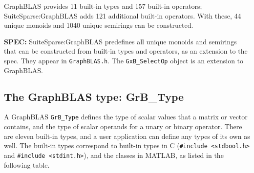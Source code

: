 \documentclass[12pt]{article}
\begin{document}
GraphBLAS provides 11 built-in types and 157 built-in operators;
SuiteSparse:GraphBLAS adds 121 additional built-in operators.  With these,
44 unique monoids and 1040 unique semirings can be constructed.

\begin{spec}
{\bf SPEC:} SuiteSparse:GraphBLAS predefines all unique monoids and semirings
that can be constructed from built-in types and operators, as an extension to
the spec.  They appear in \verb'GraphBLAS.h'.  The \verb'GxB_SelectOp' object
is an extension to GraphBLAS.
\end{spec}

\newpage
\subsection{The GraphBLAS type: {\sf GrB\_Type}} %
\label{type}

A GraphBLAS \verb'GrB_Type' defines the type of scalar values that a matrix or
vector contains, and the type of scalar operands for a unary or binary
operator.  There are eleven built-in types, and a user application can define
any types of its own as well.  The built-in types correspond to built-in types
in C (\verb'#include <stdbool.h>' and \verb'#include <stdint.h>'), and the
classes in MATLAB, as listed in the following table.
\end{document}
